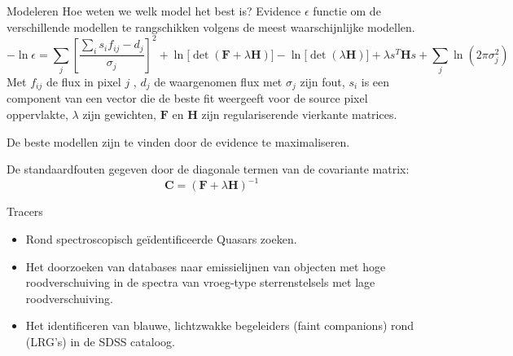 \documentclass[aspectratio=169,xcolor=dvipsnames]{beamer}
\begin{document}
\begin{frame}{Modeleren}
    Hoe weten we welk model het best is?
    Evidence \(\epsilon\) functie om de verschillende modellen te rangschikken volgens de meest waarschijnlijke modellen.
    \[ 
    -\ln \epsilon = \sum_j \left[\frac{\sum_i s_i f_{ij} - d_j}{\sigma_j}\right]^2
    + \ln\!\bigl[\det(\bm F + \lambda  \bm H)\bigr]
    - \ln\!\bigl[\det(\lambda \bm H)\bigr]
    + \lambda s^{T} \bm H s
    + \sum_j \ln\!\left(2\pi \sigma_j^2\right)
    \]
    Met \(f_{ij}\) de flux in pixel \(j\) , \(d_j\) de waargenomen flux met \(\sigma_j\) zijn fout,  \(s_i\) is een component van een vector die de beste fit weergeeft voor de source pixel oppervlakte, \(\lambda\) zijn gewichten, \(\bm F\) en \(\bm H\) zijn regulariserende vierkante matrices.
    
    De beste modellen zijn te vinden door de evidence te maximaliseren.

    De standaardfouten gegeven door de diagonale termen van de covariante matrix:
    \[
    \bm C = (\bm F + \lambda \bm H)^{-1}
    \]
    
\end{frame}


\begin{frame}{Tracers}
\begin{itemize}
    \item Rond spectroscopisch geïdentificeerde Quasars zoeken.
    \item Het doorzoeken van databases naar emissielijnen van objecten met hoge roodverschuiving in de spectra van vroeg-type sterrenstelsels met lage roodverschuiving.
    \item Het identificeren van blauwe, lichtzwakke begeleiders (faint companions) rond (LRG's) in de SDSS cataloog.
\end{itemize}

\end{frame}
\end{document}
